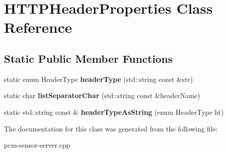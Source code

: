\section{H\+T\+T\+P\+Header\+Properties Class Reference}
\label{classHTTPHeaderProperties}
\subsection*{Static Public Member Functions}
\begin{DoxyCompactItemize}
\item 
\mbox{\label{classHTTPHeaderProperties_a18411643f4974411c7db07a39bd76875}} 
static enum Header\+Type {\bfseries header\+Type} (std\+::string const \&str)
\item 
\mbox{\label{classHTTPHeaderProperties_ae2633c0dbf98f6b0c8087e266c12f6cf}} 
static char {\bfseries list\+Separator\+Char} (std\+::string const \&header\+Name)
\item 
\mbox{\label{classHTTPHeaderProperties_a5eb5aaf87ef15e7e6a930559aba20dd4}} 
static std\+::string const  \& {\bfseries header\+Type\+As\+String} (enum Header\+Type ht)
\end{DoxyCompactItemize}


The documentation for this class was generated from the following file\+:\begin{DoxyCompactItemize}
\item 
pcm-\/sensor-\/server.\+cpp\end{DoxyCompactItemize}
